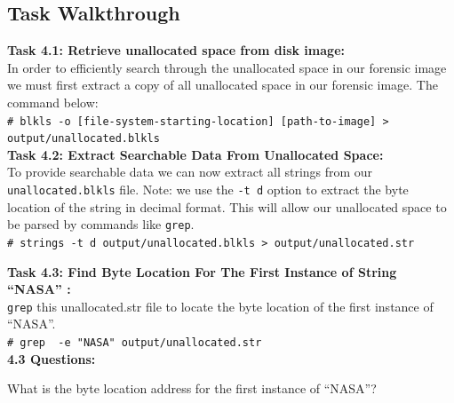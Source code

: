 \documentclass[a4paper,11pt]{article}
\begin{document}
\subsection*{Task Walkthrough}
{\noindent
\textbf{Task 4.1: Retrieve unallocated space from disk image:}\\
In order to efficiently search through the unallocated space in our forensic image we must first extract a copy of all unallocated space in our forensic image. The command below:\\

\texttt{{\#} blkls -o [file-system-starting-location] [path-to-image] > \\output/unallocated.blkls}\\

}
{\noindent
\textbf{Task 4.2: Extract Searchable Data From Unallocated Space:}\\
To provide searchable data we can now extract all strings from our \texttt{unallocated.blkls} file. Note: we use the \texttt{-t d} option to extract the byte location of the string in decimal format. This will allow our unallocated space to be parsed by commands like \texttt{grep}.\\

\verb|# strings -t d output/unallocated.blkls > output/unallocated.str|\\

}
{\noindent
\textbf{Task 4.3: Find Byte Location For The First Instance of String ``NASA'' :}\\
\texttt{grep} this unallocated.str file to locate the byte location of the first instance of ``NASA''.\\

\verb|# grep  -e "NASA" output/unallocated.str|\\

\noindent
\textbf{4.3 Questions:}
\begin{enumerate*}
	\item What is the byte location address for the first instance of ``NASA''?\\
\end{enumerate*}
}
\end{document}
